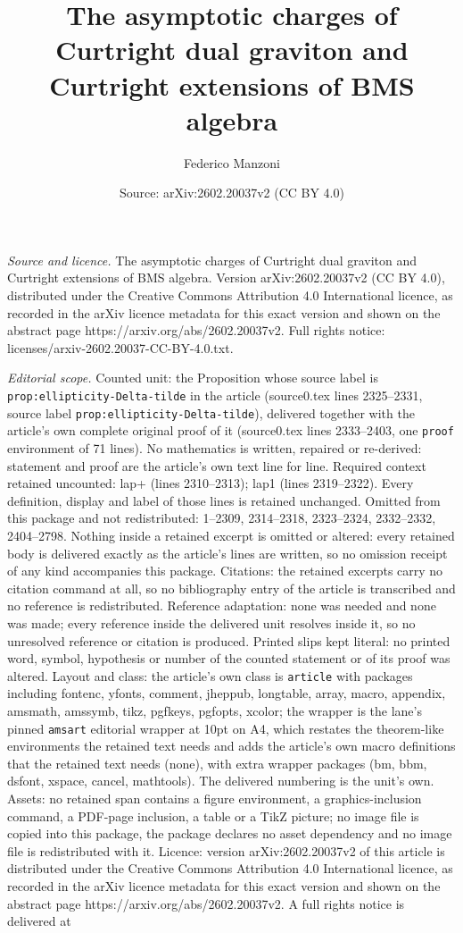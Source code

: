 \documentclass[10pt,a4paper]{amsart}
\title[The asymptotic charges of Curtright dual graviton and Curtri]{The asymptotic charges of Curtright dual graviton and Curtright extensions of BMS algebra}
\author{Federico Manzoni}
\date{Source: arXiv:2602.20037v2 (CC BY 4.0)}
\begin{document}
\maketitle

\noindent\emph{Source and licence.} The asymptotic charges of Curtright dual graviton and Curtright extensions of BMS algebra. Version arXiv:2602.20037v2 (CC BY 4.0), distributed under the Creative Commons Attribution 4.0 International licence, as recorded in the arXiv licence metadata for this exact version and shown on the abstract page https://arxiv.org/abs/2602.20037v2. Full rights notice: licenses/arxiv-2602.20037-CC-BY-4.0.txt.\par\smallskip

\noindent\textit{Editorial scope.} Counted unit: the Proposition whose source label is \texttt{prop:ellipticity-Delta-tilde} in the article (source0.tex lines 2325--2331, source label \texttt{prop:ellipticity-Delta-tilde}), delivered together with the article's own complete original proof of it (source0.tex lines 2333--2403, one \texttt{proof} environment of 71 lines). No mathematics is written, repaired or re-derived: statement and proof are the article's own text line for line. Required context retained uncounted: lap+ (lines 2310--2313); lap1 (lines 2319--2322). Every definition, display and label of those lines is retained unchanged. Omitted from this package and not redistributed: 1--2309, 2314--2318, 2323--2324, 2332--2332, 2404--2798. Nothing inside a retained excerpt is omitted or altered: every retained body is delivered exactly as the article's lines are written, so no omission receipt of any kind accompanies this package. Citations: the retained excerpts carry no citation command at all, so no bibliography entry of the article is transcribed and no reference is redistributed. Reference adaptation: none was needed and none was made; every reference inside the delivered unit resolves inside it, so no unresolved reference or citation is produced. Printed slips kept literal: no printed word, symbol, hypothesis or number of the counted statement or of its proof was altered. Layout and class: the article's own class is \texttt{article} with packages including fontenc, yfonts, comment, jheppub, longtable, array, macro, appendix, amsmath, amssymb, tikz, pgfkeys, pgfopts, xcolor; the wrapper is the lane's pinned \texttt{amsart} editorial wrapper at 10pt on A4, which restates the theorem-like environments the retained text needs and adds the article's own macro definitions that the retained text needs (none), with extra wrapper packages (bm, bbm, dsfont, xspace, cancel, mathtools). The delivered numbering is the unit's own. Assets: no retained span contains a figure environment, a graphics-inclusion command, a PDF-page inclusion, a table or a TikZ picture; no image file is copied into this package, the package declares no asset dependency and no image file is redistributed with it. Licence: version arXiv:2602.20037v2 of this article is distributed under the Creative Commons Attribution 4.0 International licence, as recorded in the arXiv licence metadata for this exact version and shown on the abstract page https://arxiv.org/abs/2602.20037v2. A full rights notice is delivered at 
\end{document}
